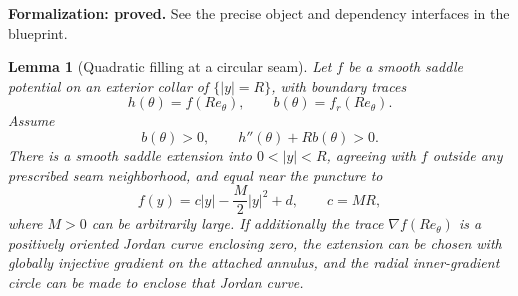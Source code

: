 \documentclass[11pt]{amsart}
\newtheorem{lemma}[theorem]{Lemma}
\theoremstyle{definition}
\theoremstyle{remark}
\numberwithin{equation}{section}
\begin{document}
\par\noindent\textbf{Formalization: proved.} See the precise object and dependency interfaces in the blueprint.\par
\begin{lemma}[Quadratic filling at a circular seam]
\label{lem:quadratic-filling}
Let $f$ be a smooth saddle potential on an exterior collar of
$\{|y|=R\}$, with boundary traces
\[
 h(\theta)=f(Re_\theta),\qquad b(\theta)=f_r(Re_\theta).
\]
Assume
\begin{equation}\label{eq:radial-fill-data}
 b(\theta)>0,\qquad h''(\theta)+Rb(\theta)>0.
\end{equation}
There is a smooth saddle extension into $0<|y|<R$, agreeing with $f$
outside any prescribed seam neighborhood, and equal near the puncture to
\begin{equation}\label{eq:quadratic-germ}
 f(y)=c|y|-\frac M2|y|^2+d,\qquad c=MR,
\end{equation}
where $M>0$ can be arbitrarily large. If additionally the trace
$\nabla f(Re_\theta)$ is a positively oriented Jordan curve enclosing
zero, the extension can be chosen with globally injective gradient on
the attached annulus, and the radial inner-gradient circle can be made
to enclose that Jordan curve.
\end{lemma}
\end{document}
